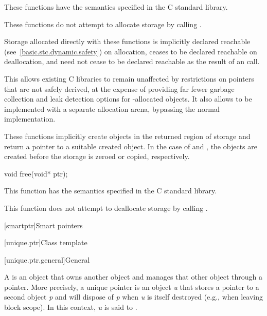 \begin{itemdescr}
\pnum
\effects
These functions have the semantics specified in the C standard library.

\pnum
\remarks
These functions do not attempt to allocate
storage by calling .
%

\pnum
Storage allocated directly with these functions
is implicitly declared reachable
(see~\ref{basic.stc.dynamic.safety}) on allocation, ceases to be declared
reachable on deallocation, and need not cease to be declared reachable as the
result of an  call.
\begin{note}
This allows existing
C libraries to remain unaffected by restrictions on pointers that are not safely
derived, at the expense of providing far fewer garbage collection and leak
detection options for -allocated objects. It also allows
 to be implemented with a separate allocation arena, bypassing
the normal  implementation.
\end{note}

\pnum
These functions implicitly create objects
in the returned region of storage and
return a pointer to a suitable created object.
In the case of  and ,
the objects are created before the storage is zeroed or copied, respectively.
\end{itemdescr}

%
\begin{itemdecl}
void free(void* ptr);
\end{itemdecl}

\begin{itemdescr}
\pnum
\effects
This function has the semantics specified in the C standard library.

\pnum
\remarks
This function does not attempt to
deallocate storage by calling
.
\end{itemdescr}


[smartptr]{Smart pointers}

[unique.ptr]{Class template }

[unique.ptr.general]{General}

\pnum
A  is an object that owns another object and
manages that other object through a pointer. More precisely, a unique pointer
is an object \textit{u} that stores a pointer to a second object \textit{p} and
will dispose of \textit{p} when \textit{u} is itself destroyed (e.g., when
leaving block scope). In this context, \textit{u} is said
to  .

